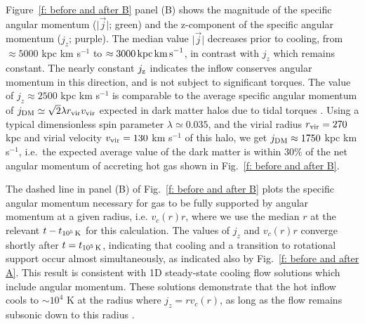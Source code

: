 \documentclass[fleqn,usenatbib]{mnras}
\newcommand{\tcon}{t_{10^5\,{\rm K}}}
\newcommand{\Rvir}{r_{\rm vir}}
\newcommand{\vvir}{v_{\rm vir}}
\begin{document}
Figure~\ref{f: before and after B} panel (B) shows the magnitude of the specific angular momentum ($\vert \vec j \vert$; green) and the z-component of the specific angular momentum ($j_z$; purple).
The median value $\vert \vec j \vert$ decreases prior to cooling, from $\approx 5000$ kpc km s$^{-1}$ to $\approx 3000\,{\rm kpc\,km\,s}^{-1}$, in contrast with  $j_z$ which remains constant.
The nearly constant $j_{\rm z}$ indicates the inflow conserves angular momentum in this direction, and is not subject to significant torques. 
The value of $j_z\approx 2500$ kpc km s$^{-1}$ is comparable to the average specific angular momentum of $j_{\rm DM} \simeq \sqrt{2}\lambda \Rvir \vvir$ expected in dark matter halos due to tidal torques \citep[e.g.][]{Bullock2001}.
Using a typical dimensionless spin parameter $\lambda \simeq 0.035$, and the virial radius $\Rvir=270$ kpc and virial velocity $\vvir=130$ km s$^{-1}$ of this halo, we get $j_{\rm DM}\approx1750$ kpc km s$^{-1}$, i.e.~the expected average value of the dark matter is within $30\%$ of the net angular momentum of accreting hot gas shown in Fig.~\ref{f: before and after B}. 

The dashed line in panel (B) of Fig.~\ref{f: before and after B} plots the specific angular momentum necessary for gas to be fully supported by angular momentum at a given radius, i.e. $v_c(r)r$, where we use the median $r$ at the relevant $t-\tcon$ for this calculation. 
The values of $j_z$ and $v_c(r)r$ converge shortly after $t=\tcon$, indicating that cooling and a transition to rotational support occur almost simultaneously, as indicated also by Fig.~\ref{f: before and after A}.
This result is consistent with 1D steady-state cooling flow solutions which include angular momentum.
These solutions demonstrate that the hot inflow cools to $\sim10^4$ K at the radius where $j_z=r v_c(r)$, as long as the flow remains subsonic down to this radius \citep{Cowie1980, Stern2019}.

\end{document}
